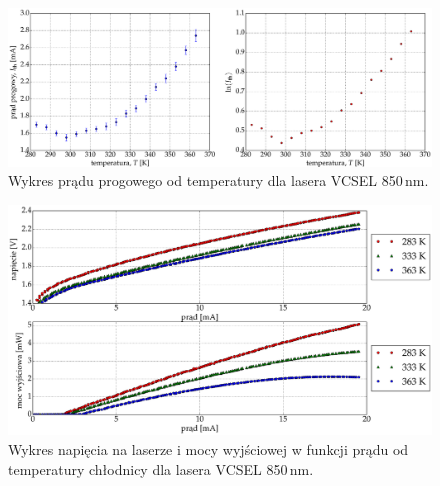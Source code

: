 \begin{figure}
\center
  \includegraphics[scale=0.30]{plot_vcsel_850/plot_temp_i_th_log_lin.eps}
  \caption{Wykres prądu progowego od temperatury dla lasera VCSEL 850\,nm.}
  \label{vcsel_850_rys_7}
\end{figure}
\begin{figure}
\center
  \includegraphics[scale=0.30]{plot_vcsel_850/plot_power_voltage.eps}
  \caption{Wykres napięcia na laserze i mocy wyjściowej w funkcji prądu od temperatury chłodnicy dla lasera VCSEL 850\,nm.}
  \label{vcsel_850_rys_2}
\end{figure}
